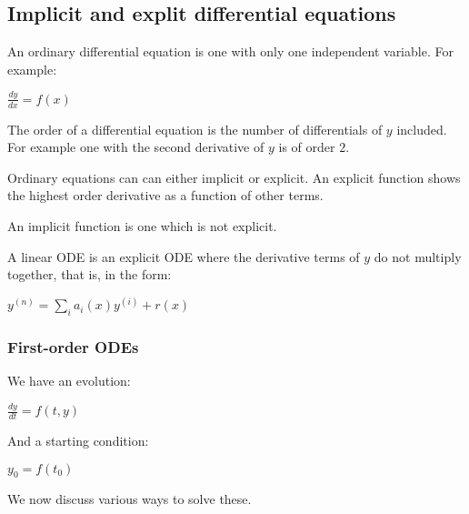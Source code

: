 
\subsection{Implicit and explit differential equations}

An ordinary differential equation is one with only one independent variable. For example:

$\frac{dy}{dx}=f(x)$

The order of a differential equation is the number of differentials of \(y\) included. For example one with the second derivative of \(y\) is of order \(2\).

Ordinary equations can can either implicit or explicit. An explicit function shows the highest order derivative as a function of other terms.

An implicit function is one which is not explicit.

A linear ODE is an explicit ODE where the derivative terms of \(y\) do not multiply together, that is, in the form:

$y^{(n)}=\sum_ia_i(x)y^{(i)}+r(x)$

\subsubsection{First-order ODEs}

We have an evolution:

\(\frac{dy}{dt}=f(t,y)\)

And a starting condition:

\(y_0=f(t_0)\)

We now discuss various ways to solve these.

